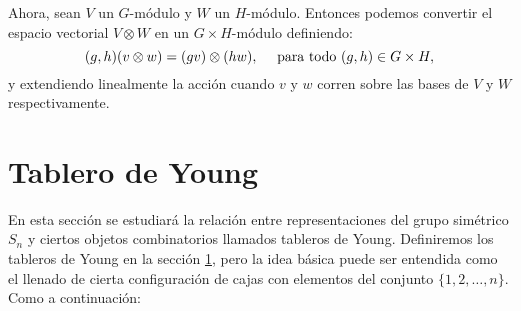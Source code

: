 \documentclass[12pt]{book}
\theoremstyle{definition}
\newtheorem{definition}[theorem]{Definición}
\newcounter{in}
\newcounter{ini}
\begin{document}
\begin{mdframed}
Ahora, sean $V$ un $G$-módulo y $W$ un $H$-módulo. Entonces podemos convertir el espacio vectorial $V \otimes W$ en un $G \times H$-módulo definiendo:
\begin{equation*}
(g,h)(v \otimes w) = (gv) \otimes (hw), \quad \textup{ para todo } (g,h) \in G \times H,
\end{equation*}
y extendiendo linealmente la acción cuando $v$ y $w$ corren sobre las bases de $V$ y $W$ respectivamente.
%

\end{mdframed}
\section{Tablero de Young}
\label{tablero}
En esta sección se estudiará la relación entre representaciones del
grupo simétrico $S_{n}$ y ciertos objetos combinatorios llamados tableros de
Young. Definiremos los tableros de Young en la sección
\ref{tablero}, pero la idea básica puede ser entendida como el llenado de
cierta configuración de cajas con elementos del conjunto
$\{1,2,\ldots,n\}$. Como a continuación:
\end{document}
